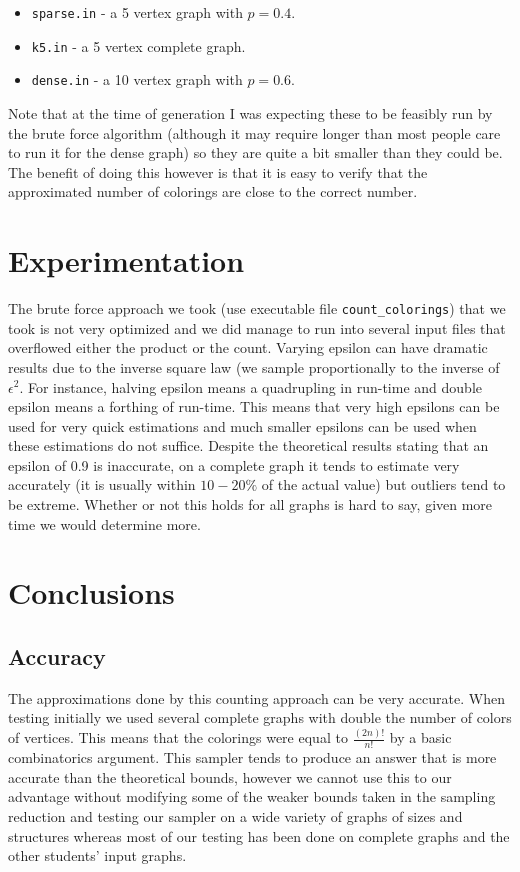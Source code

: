 \documentclass[14]{article}
\begin{document}
\begin{itemize}
\item \texttt{sparse.in} - a 5 vertex graph with $p=0.4$.
\item \texttt{k5.in} - a 5 vertex complete graph.
\item \texttt{dense.in} - a 10 vertex graph with $p=0.6$.
\end{itemize}
Note that at the time of generation I was expecting these to be feasibly run by the brute force algorithm (although it may require longer than most people care to run it for the dense graph) so they are quite a bit smaller than they could be. The benefit of doing this however is that it is easy to verify that the approximated number of colorings are close to the correct number.
\section{Experimentation}
The brute force approach we took (use executable file \texttt{count\_colorings}) that we took is not very optimized and we did manage to run into several input files that overflowed either the product or the count.
Varying epsilon can have dramatic results due to the inverse square law (we sample proportionally to the inverse of $\epsilon^2$. For instance, halving epsilon means a quadrupling in run-time and double epsilon means a forthing of run-time. This means that very high epsilons can be used for very quick estimations and much smaller epsilons can be used when these estimations do not suffice. Despite the theoretical results stating that an epsilon of 0.9 is inaccurate, on a complete graph it tends to estimate very accurately (it is usually within $10-20\%$ of the actual value) but outliers tend to be extreme. Whether or not this holds for all graphs is hard to say, given more time we would determine more.
\section{Conclusions}
\subsection{Accuracy}
The approximations done by this counting approach can be very accurate. When testing initially we used several complete graphs with double the number of colors of vertices. This means that the colorings were equal to $\frac{(2n)!}{n!}$ by a basic combinatorics argument. This sampler tends to produce an answer that is more accurate than the theoretical bounds, however we cannot use this to our advantage without modifying some of the weaker bounds taken in the sampling reduction and testing our sampler on a wide variety of graphs of sizes and structures whereas most of our testing has been done on complete graphs and the other students' input graphs.
\end{document}
